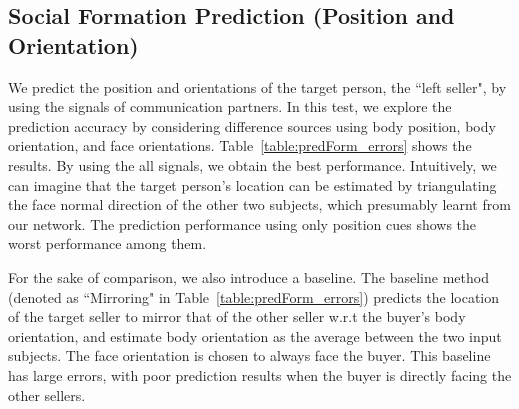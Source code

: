 \subsection{Social Formation Prediction (Position and Orientation)}
We predict the position and orientations of the target person, the ``left seller", by using the signals of communication partners. In this test, we explore the prediction accuracy by considering difference sources using body position, body orientation, and face orientations. Table~\ref{table:predForm_errors} shows the results. By using the all signals, we obtain the best performance. Intuitively, we can imagine that the target person's location can be estimated by triangulating the face normal direction of the other two subjects, which presumably learnt from our network. The prediction performance using only position cues shows the worst performance among them. 

For the sake of comparison, we also introduce a baseline. The baseline method (denoted as ``Mirroring" in Table~\ref{table:predForm_errors}) predicts the location of the target seller to mirror that of the other seller w.r.t the buyer's body orientation, and estimate body orientation as the average between the two input subjects. The face orientation is chosen to always face the buyer. This baseline has large errors, with poor prediction results when the buyer is directly facing the other sellers. 


